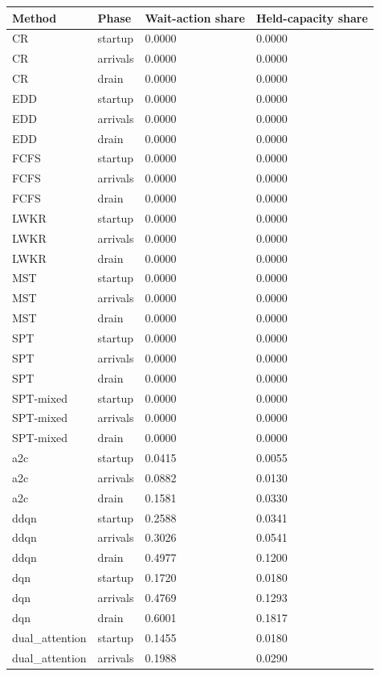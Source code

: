 \begin{tabular}{llll}
\toprule
Method & Phase & Wait-action share & Held-capacity share\\
\midrule
CR & startup & 0.0000 & 0.0000\\
CR & arrivals & 0.0000 & 0.0000\\
CR & drain & 0.0000 & 0.0000\\
EDD & startup & 0.0000 & 0.0000\\
EDD & arrivals & 0.0000 & 0.0000\\
EDD & drain & 0.0000 & 0.0000\\
FCFS & startup & 0.0000 & 0.0000\\
FCFS & arrivals & 0.0000 & 0.0000\\
FCFS & drain & 0.0000 & 0.0000\\
LWKR & startup & 0.0000 & 0.0000\\
LWKR & arrivals & 0.0000 & 0.0000\\
LWKR & drain & 0.0000 & 0.0000\\
MST & startup & 0.0000 & 0.0000\\
MST & arrivals & 0.0000 & 0.0000\\
MST & drain & 0.0000 & 0.0000\\
SPT & startup & 0.0000 & 0.0000\\
SPT & arrivals & 0.0000 & 0.0000\\
SPT & drain & 0.0000 & 0.0000\\
SPT-mixed & startup & 0.0000 & 0.0000\\
SPT-mixed & arrivals & 0.0000 & 0.0000\\
SPT-mixed & drain & 0.0000 & 0.0000\\
a2c & startup & 0.0415 & 0.0055\\
a2c & arrivals & 0.0882 & 0.0130\\
a2c & drain & 0.1581 & 0.0330\\
ddqn & startup & 0.2588 & 0.0341\\
ddqn & arrivals & 0.3026 & 0.0541\\
ddqn & drain & 0.4977 & 0.1200\\
dqn & startup & 0.1720 & 0.0180\\
dqn & arrivals & 0.4769 & 0.1293\\
dqn & drain & 0.6001 & 0.1817\\
dual\_attention & startup & 0.1455 & 0.0180\\
dual\_attention & arrivals & 0.1988 & 0.0290\\

\end{tabular}
